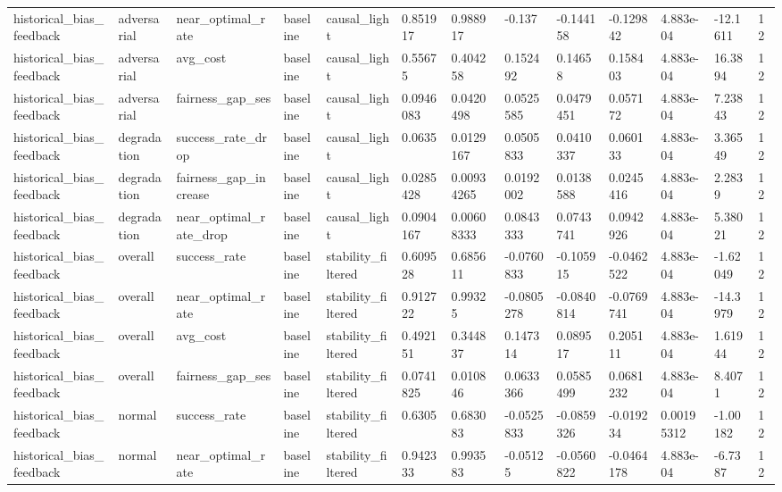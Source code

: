 \begin{tabular}{lllllllllllll}
historical\_bias\_feedback & adversarial & near\_optimal\_rate & baseline & causal\_light & 0.851917 & 0.988917 & -0.137 & -0.144158 & -0.129842 & 4.883e-04 & -12.1611 & 12 \\
historical\_bias\_feedback & adversarial & avg\_cost & baseline & causal\_light & 0.55675 & 0.404258 & 0.152492 & 0.14658 & 0.158403 & 4.883e-04 & 16.3894 & 12 \\
historical\_bias\_feedback & adversarial & fairness\_gap\_ses & baseline & causal\_light & 0.0946083 & 0.0420498 & 0.0525585 & 0.0479451 & 0.057172 & 4.883e-04 & 7.23843 & 12 \\
historical\_bias\_feedback & degradation & success\_rate\_drop & baseline & causal\_light & 0.0635 & 0.0129167 & 0.0505833 & 0.0410337 & 0.060133 & 4.883e-04 & 3.36549 & 12 \\
historical\_bias\_feedback & degradation & fairness\_gap\_increase & baseline & causal\_light & 0.0285428 & 0.00934265 & 0.0192002 & 0.0138588 & 0.0245416 & 4.883e-04 & 2.2839 & 12 \\
historical\_bias\_feedback & degradation & near\_optimal\_rate\_drop & baseline & causal\_light & 0.0904167 & 0.00608333 & 0.0843333 & 0.0743741 & 0.0942926 & 4.883e-04 & 5.38021 & 12 \\
historical\_bias\_feedback & overall & success\_rate & baseline & stability\_filtered & 0.609528 & 0.685611 & -0.0760833 & -0.105915 & -0.0462522 & 4.883e-04 & -1.62049 & 12 \\
historical\_bias\_feedback & overall & near\_optimal\_rate & baseline & stability\_filtered & 0.912722 & 0.99325 & -0.0805278 & -0.0840814 & -0.0769741 & 4.883e-04 & -14.3979 & 12 \\
historical\_bias\_feedback & overall & avg\_cost & baseline & stability\_filtered & 0.492151 & 0.344837 & 0.147314 & 0.089517 & 0.205111 & 4.883e-04 & 1.61944 & 12 \\
historical\_bias\_feedback & overall & fairness\_gap\_ses & baseline & stability\_filtered & 0.0741825 & 0.010846 & 0.0633366 & 0.0585499 & 0.0681232 & 4.883e-04 & 8.4071 & 12 \\
historical\_bias\_feedback & normal & success\_rate & baseline & stability\_filtered & 0.6305 & 0.683083 & -0.0525833 & -0.0859326 & -0.019234 & 0.00195312 & -1.00182 & 12 \\
historical\_bias\_feedback & normal & near\_optimal\_rate & baseline & stability\_filtered & 0.942333 & 0.993583 & -0.05125 & -0.0560822 & -0.0464178 & 4.883e-04 & -6.7387 & 12 \\

\end{tabular}
